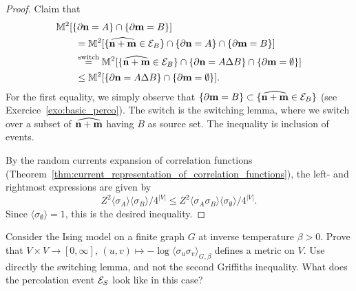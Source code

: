 \begin{proof}
    Claim that
    \begin{align}
        &\M^2[\{\partial\n=A\}\cap\{\partial\m=B\}]
        \\
        &\qquad=
        \M^2[\{\widehat{\n+\m} \in \calE_B\}\cap\{\partial\n=A\}\cap\{\partial\m=B\}]
        \\
        &\qquad\stackrel{\text{switch}}=
        \M^2[\{\widehat{\n+\m} \in \calE_B\}\cap\{\partial\n=A\Delta
        B\}\cap\{\partial\m=\emptyset\}]
        \\
        &\qquad\leq
        \M^2[\{\partial\n=A\Delta B\}\cap\{\partial\m=\emptyset\}].
    \end{align}
    For the first equality, we simply observe that $\{\partial\mathbf{m}=B\}\subset
    \{\widehat{\mathbf{n}+\mathbf{m}} \in \mathcal E_B\}$
    (see Exercice~\ref{exo:basic_perco}).
    The switch is the switching lemma, where we switch over a subset of $\widehat{\mathbf{n}+\mathbf{m}}$
    having $B$ as source set.
    The inequality is inclusion of events.

    By the random currents expansion of correlation functions
    (Theorem~\ref{thm:current_representation_of_correlation_functions}),
    the left- and rightmost expressions are given by
    \[
        Z^2\langle\sigma_A\rangle\langle\sigma_B\rangle/4^{|V|}
        \leq
        Z^2\langle\sigma_A\sigma_B\rangle\langle\sigma_\emptyset\rangle/4^{|V|}.
    \]
    Since $\langle\sigma_\emptyset\rangle=1$, this is the desired inequality.
\end{proof}

\begin{exercise}
    Consider the Ising model on a finite graph $G$
    at inverse temperature $\beta>0$.
    Prove that $V\times V\to [0,\infty],\,
    (u,v)\mapsto-\log\langle\sigma_u\sigma_v\rangle_{G,\beta}$
    defines a metric on $V$.
    Use directly the switching lemma, and not the second Griffiths inequality.
    What does the percolation event $\mathcal E_S$ look like in this case?
\end{exercise}


